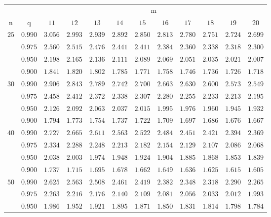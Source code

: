 \documentclass[11pt]{article}
\theoremstyle{definition}
\begin{document}
\begin{table}[H]
	\begin{tabularx}{\linewidth}{c | c | c c c c c c c c c c}
		& & \multicolumn{10}{c}{m}\\
		\cline{3-12}
		n & q & $11$ & $12$ & $13$ & $14$ & $15$ & $16$ & $17$ & $18$ & $19$ & $20$\\
		\hline
		$25$ & $0.990$ & $3.056$ & $2.993$ & $2.939$ & $2.892$ & $2.850$ & $2.813$ & $2.780$ & $2.751$ & $2.724$ & $2.699$ \\
		& $0.975$ & $2.560$ & $2.515$ & $2.476$ & $2.441$ & $2.411$ & $2.384$ & $2.360$ & $2.338$ & $2.318$ & $2.300$ \\
		& $0.950$ & $2.198$ & $2.165$ & $2.136$ & $2.111$ & $2.089$ & $2.069$ & $2.051$ & $2.035$ & $2.021$ & $2.007$ \\
		& $0.900$ & $1.841$ & $1.820$ & $1.802$ & $1.785$ & $1.771$ & $1.758$ & $1.746$ & $1.736$ & $1.726$ & $1.718$ \\
		$30$ & $0.990$ & $2.906$ & $2.843$ & $2.789$ & $2.742$ & $2.700$ & $2.663$ & $2.630$ & $2.600$ & $2.573$ & $2.549$ \\
		& $0.975$ & $2.458$ & $2.412$ & $2.372$ & $2.338$ & $2.307$ & $2.280$ & $2.255$ & $2.233$ & $2.213$ & $2.195$ \\
		& $0.950$ & $2.126$ & $2.092$ & $2.063$ & $2.037$ & $2.015$ & $1.995$ & $1.976$ & $1.960$ & $1.945$ & $1.932$ \\
		& $0.900$ & $1.794$ & $1.773$ & $1.754$ & $1.737$ & $1.722$ & $1.709$ & $1.697$ & $1.686$ & $1.676$ & $1.667$ \\
		$40$ & $0.990$ & $2.727$ & $2.665$ & $2.611$ & $2.563$ & $2.522$ & $2.484$ & $2.451$ & $2.421$ & $2.394$ & $2.369$ \\
		& $0.975$ & $2.334$ & $2.288$ & $2.248$ & $2.213$ & $2.182$ & $2.154$ & $2.129$ & $2.107$ & $2.086$ & $2.068$ \\
		& $0.950$ & $2.038$ & $2.003$ & $1.974$ & $1.948$ & $1.924$ & $1.904$ & $1.885$ & $1.868$ & $1.853$ & $1.839$ \\
		& $0.900$ & $1.737$ & $1.715$ & $1.695$ & $1.678$ & $1.662$ & $1.649$ & $1.636$ & $1.625$ & $1.615$ & $1.605$ \\
		$50$ & $0.990$ & $2.625$ & $2.563$ & $2.508$ & $2.461$ & $2.419$ & $2.382$ & $2.348$ & $2.318$ & $2.290$ & $2.265$ \\
		& $0.975$ & $2.263$ & $2.216$ & $2.176$ & $2.140$ & $2.109$ & $2.081$ & $2.056$ & $2.033$ & $2.012$ & $1.993$ \\
		& $0.950$ & $1.986$ & $1.952$ & $1.921$ & $1.895$ & $1.871$ & $1.850$ & $1.831$ & $1.814$ & $1.798$ & $1.784$ \\

\end{tabularx}
\end{table}
\end{document}
